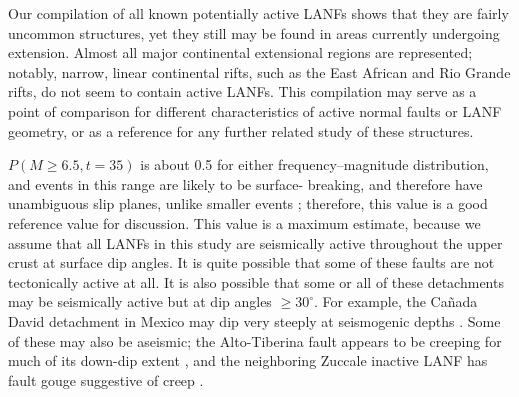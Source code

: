 \documentclass[twocolumn,grl]{AGUTeX}
\begin{document}
\begin{article}
Our compilation of all known potentially active LANFs shows that they are
fairly uncommon structures, yet they still may be found in areas currently
undergoing extension. Almost all major continental extensional regions are
represented; notably, narrow, linear continental rifts, such as the East
African and Rio Grande rifts, do not seem to contain active LANFs.  This
compilation may serve as a point of comparison for different characteristics of
active normal faults or LANF geometry, or as a reference for any further
related study of these structures.




$P(M\ge6.5, t=35)$ is about 0.5 for either frequency--magnitude distribution,
and events in this range are likely to be surface- breaking, and therefore have
unambiguous slip planes, unlike smaller events \citep{hecker2013eqdist};
therefore, this value is a good reference value for discussion.  This value is
a maximum estimate, because we assume that all LANFs in this study are
seismically active throughout the upper crust at surface dip angles.  It is
quite possible that some of these faults are not tectonically active at all. It
is also possible that some or all of these detachments may be seismically
active but at dip angles $\ge30^\circ$.  For example, the Ca\~nada David
detachment in Mexico may dip very steeply at seismogenic depths
\citep{fletcherspelz2009}.  Some of these may also be aseismic; the
Alto-Tiberina fault appears to be creeping for much of its down-dip extent
\citep{hreinsdottir2009altotib}, and the neighboring Zuccale inactive LANF has
fault gouge suggestive of creep  \citep{collettiniholdsworth2004}.


\end{article}
\end{document}
